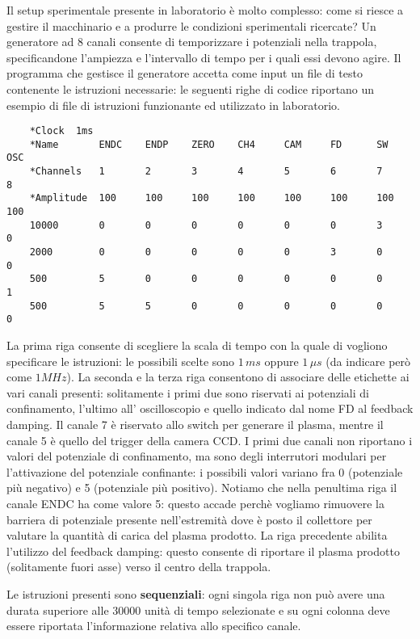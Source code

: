 Il setup sperimentale presente in laboratorio è molto complesso: come si riesce a gestire il macchinario e a produrre le 
condizioni sperimentali ricercate? Un generatore ad 8 canali consente di temporizzare i potenziali nella trappola, specificandone 
l'ampiezza e l'intervallo di tempo per i quali essi devono agire. Il programma che gestisce il generatore accetta come input un
file di testo contenente le istruzioni necessarie: le seguenti righe di codice riportano un esempio di file di istruzioni
funzionante ed utilizzato in laboratorio. 
\begin{verbatim}
    *Clock	1ms							
    *Name	    ENDC	ENDP	ZERO	CH4	    CAM	    FD	    SW	    OSC
    *Channels	1	    2	    3	    4	    5	    6	    7	    8
    *Amplitude	100	    100	    100	    100	    100 	100	    100 	100
    10000	    0	    0	    0	    0	    0	    0	    3	    0
    2000	    0	    0	    0	    0	    0	    3	    0	    0
    500	        5	    0	    0	    0	    0	    0	    0	    1
    500	        5	    5	    0	    0	    0	    0	    0	    0
\end{verbatim}
La prima riga consente di scegliere la scala di tempo con la quale di vogliono specificare le istruzioni: le possibili scelte
sono $1\,ms$ oppure $1\,\mu s$ (da indicare però come $1MHz$). La seconda e la terza riga consentono di associare delle
etichette ai vari canali presenti: solitamente i primi due sono riservati ai potenziali di confinamento, l'ultimo all'
oscilloscopio e quello indicato dal nome FD al feedback damping. Il canale 7 è riservato allo switch per generare il plasma, 
mentre il canale 5 è quello del trigger della camera CCD.
I primi due canali non riportano i valori del potenziale di confinamento, ma sono degli interrutori modulari per l'attivazione
del potenziale confinante: i possibili valori variano fra 0 (potenziale più negativo) e 5 (potenziale più positivo). Notiamo 
che nella penultima riga il canale ENDC ha come valore 5: questo accade perchè vogliamo rimuovere la barriera di potenziale
presente nell'estremità dove è posto il collettore per valutare la quantità di carica del plasma prodotto. La riga precedente
abilita l'utilizzo del feedback damping: questo consente di riportare il plasma prodotto (solitamente fuori asse) verso il 
centro della trappola.

Le istruzioni presenti sono \textbf{sequenziali}: ogni singola riga non può avere una durata superiore alle 30000 unità
di tempo selezionate e su ogni colonna deve essere riportata l'informazione relativa allo specifico canale.\\

